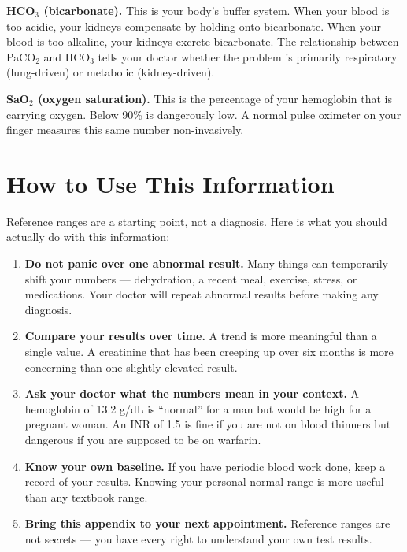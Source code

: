 \textbf{HCO$_3$ (bicarbonate).} This is your body's buffer system. When your blood is too acidic, your kidneys compensate by holding onto bicarbonate. When your blood is too alkaline, your kidneys excrete bicarbonate. The relationship between PaCO$_2$ and HCO$_3$ tells your doctor whether the problem is primarily respiratory (lung-driven) or metabolic (kidney-driven).

\textbf{SaO$_2$ (oxygen saturation).} This is the percentage of your hemoglobin that is carrying oxygen. Below 90\% is dangerously low. A normal pulse oximeter on your finger measures this same number non-invasively.

\clearpage
\section{How to Use This Information}

Reference ranges are a starting point, not a diagnosis. Here is what you should actually do with this information:

\begin{enumerate}
    \item \textbf{Do not panic over one abnormal result.} Many things can temporarily shift your numbers --- dehydration, a recent meal, exercise, stress, or medications. Your doctor will repeat abnormal results before making any diagnosis.

    \item \textbf{Compare your results over time.} A trend is more meaningful than a single value. A creatinine that has been creeping up over six months is more concerning than one slightly elevated result.

    \item \textbf{Ask your doctor what the numbers mean in your context.} A hemoglobin of 13.2 g/dL is ``normal'' for a man but would be high for a pregnant woman. An INR of 1.5 is fine if you are not on blood thinners but dangerous if you are supposed to be on warfarin.

    \item \textbf{Know your own baseline.} If you have periodic blood work done, keep a record of your results. Knowing your personal normal range is more useful than any textbook range.

    \item \textbf{Bring this appendix to your next appointment.} Reference ranges are not secrets --- you have every right to understand your own test results.
\end{enumerate}
